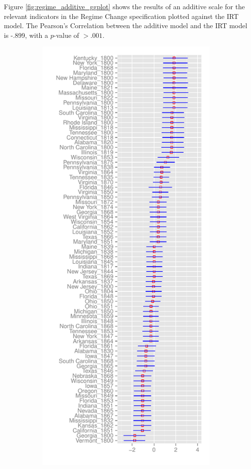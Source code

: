 \documentclass[JohnsonMADraft2]{subfiles}
\begin{document}
Figure \ref{fig:regime_additive_ggplot} shows the results of an additive scale for the relevant indicators in the Regime Change specification plotted against the IRT model.  The Pearson's Correlation between the additive model and the IRT model is -.899, with a $p$-value of $>.001$.

\begin{figure}
	\centering	\caption{Regime Change Specification- Parameter Means}\label{regime_parametermean}
	\begin{subfigure}{.5\textwidth}
		\centering
		\includegraphics[height=\textheight]{graphics/regime/regime_param_mean_first_ggplot.pdf}

\end{subfigure}
\end{figure}
\end{document}
